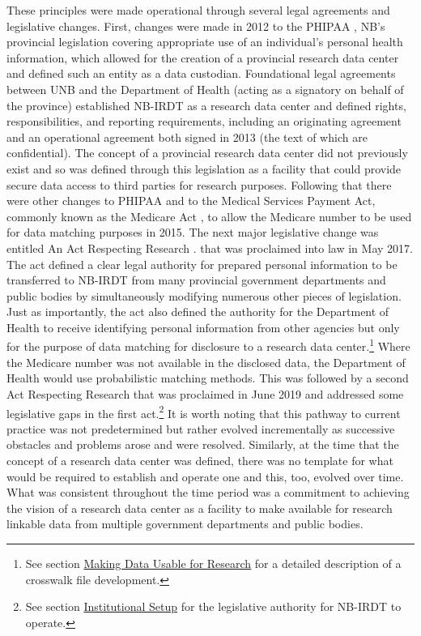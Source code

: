 These principles were made operational through several legal agreements and legislative changes. First, changes were made in 2012 to the PHIPAA \citep{governmentofnewbrunswick2009}, NB's provincial legislation covering appropriate use of an individual's personal health information, which allowed for the creation of a provincial research data center and defined such an entity as a data custodian. Foundational legal agreements between UNB and the Department of Health (acting as a signatory on behalf of the province) established NB-IRDT as a research data center and defined rights, responsibilities, and reporting requirements, including an originating agreement and an operational agreement both signed in 2013 (the text of which are confidential). The concept of a provincial research data center did not previously exist and so was defined through this legislation as a facility that could provide secure data access to third parties for research purposes. Following that there were other changes to PHIPAA and to the Medical Services Payment Act, commonly known as the Medicare Act \citep{governmentofnewbrunswick2017}, to allow the Medicare number to be used for data matching purposes in 2015. The next major legislative change was entitled An Act Respecting Research \citep{governmentofnewbrunswick2017a}. that was proclaimed into law in May 2017. The act defined a clear legal authority for prepared personal information to be transferred to NB-IRDT from many provincial government departments and public bodies by simultaneously modifying numerous other pieces of legislation. Just as importantly, the act also defined the authority for the Department of Health to receive identifying personal information from other agencies but only for the purpose of data matching for disclosure to a research data center.\footnote{See section \protect\hyperlink{nbirdt-making}{Making Data Usable for Research} for a detailed description of a crosswalk file development.} Where the Medicare number was not available in the disclosed data, the Department of Health would use probabilistic matching methods. This was followed by a second Act Respecting Research that was proclaimed in June 2019 and addressed some legislative gaps in the first act.\footnote{See section \protect\hyperlink{nbirdt-institutionalsetup}{Institutional Setup} for the legislative authority for NB-IRDT to operate.} It is worth noting that this pathway to current practice was not predetermined but rather evolved incrementally as successive obstacles and problems arose and were resolved. Similarly, at the time that the concept of a research data center was defined, there was no template for what would be required to establish and operate one and this, too, evolved over time. What was consistent throughout the time period was a commitment to achieving the vision of a research data center as a facility to make available for research linkable data from multiple government departments and public bodies.

